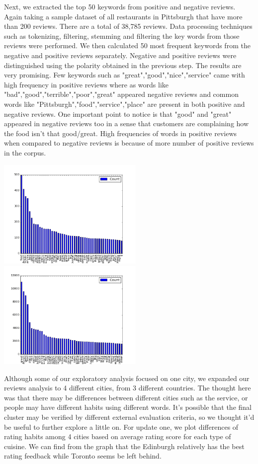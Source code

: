 \documentclass{neu_handout}
\begin{document}
Next, we extracted the top 50 keywords from positive and negative reviews. Again taking a sample dataset of all restaurants in Pittsburgh that have more than 200 reviews. There are a total of 38,785 reviews. Data processing techniques such as tokenizing, filtering, stemming and filtering the key words from those reviews were performed. We then calculated 50 most frequent keywords from the negative and positive reviews separately. Negative and positive reviews were distinguished using the polarity obtained in the previous step.
The results are very promising. Few keywords such as "great","good","nice","service" came with high frequency in positive reviews where as words like "bad","good","terrible","poor","great" appeared negative reviews and common words like "Pittsburgh","food","service","place" are present in both positive and negative reviews. One important point to notice is that "good" and "great" appeared in negative reviews too in a sense that customers are complaining how the food isn't that good/great. High frequencies of words in positive reviews when compared to negative reviews is because of more number of positive reviews in the corpus.

\begin{center}
\includegraphics[width=70mm,scale=0.5]{top50_negativereviews}
\includegraphics[width=70mm,scale=0.5]{top50_positivereviews}
\end{center}

Although some of our exploratory analysis focused on one city, we expanded our reviews analysis to 4 different cities, from 3 different countries. The thought here was that there may be differences between different cities such as the service, or people may have different habits using different words. It's possible that the final cluster may be verified by different external evaluation criteria, so we thought it'd be useful to further explore a little on. For update one, we plot differences of rating habits among 4 cities based on average rating score for each type of cuisine. We can find from the graph that the Edinburgh relatively has the best rating feedback while Toronto seems be left behind.\\
\end{document}
